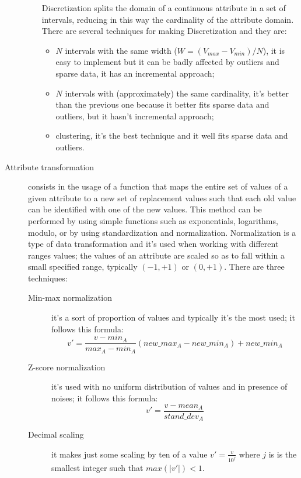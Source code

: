 \begin{description}
\begin{itemize}
		Discretization splits the domain of a continuous attribute in a set of intervals, reducing in this way the cardinality of the attribute domain.
		There are several techniques for making Discretization and they are:
		\begin{itemize}
			\item $N$ intervals with the same width ($W = (V_{max} - V_{min})/N$), it is easy to implement but it can be badly affected by outliers and sparse data, it has an incremental approach;
			\item $N$ intervals with (approximately) the same cardinality, it's better than the previous one because it better fits sparse data and outliers, but it hasn't incremental approach;
			\item clustering, it's the best technique and it well fits sparse data and outliers.
		\end{itemize}
	\end{itemize}
	\item[Attribute transformation] consists in the usage of a function that maps the entire set of values of a given attribute to a new set of replacement values such that each old value can be identified with one of the new values.
	This method can be performed by using simple functions such as exponentials, logarithms, modulo, or by using standardization and normalization.
	Normalization is a type of data transformation and it's used when working with different ranges values; the values of an attribute are scaled so as to fall within a small specified range, typically $(-1,+1)$ or $(0,+1)$.
	There are three techniques:
	\begin{description}
		\item[Min-max normalization] it's a sort of proportion of values and typically it's the most used; it follows this formula:
		$$
			v' = \frac{v - min_A}{max_A - min_A}\left(new\_max_A - new\_min_A\right) + new\_min_A
		$$
		\item[Z-score normalization] it's used with no uniform distribution of values and in presence of noises; it follows this formula:
		$$
			v' = \frac{v - mean_A}{stand\_dev_A}
		$$
		\item[Decimal scaling] it makes just some scaling by ten of a value $v' = \frac{v}{10^j}$ where $j$ is is the smallest integer such that $max\left(|v'|\right) < 1$.
	\end{description}
\end{description}

